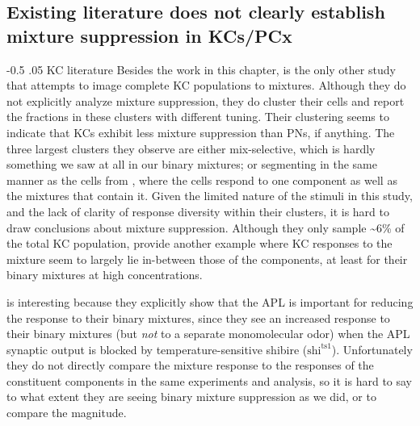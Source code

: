 \documentclass[12pt]{caltech_thesis}
\makeatletter
\let\Oldsubsection\subsection
\renewcommand{\subsection}{\FloatBarrier\Oldsubsection}
\let\Oldsubsubsection\subsubsection
\renewcommand{\subsubsection}{\FloatBarrier\Oldsubsubsection}
\renewcommand\subsubsection{%
    \@startsection{subsubsection}{4}{0mm}%
       {-0.5\baselineskip}%
       {.05\baselineskip}%
       {\normalfont\normalsize\bfseries\itshape}}
\newcommand{\ShibireTsShort}{\ensuremath{\text{shi}^{\text{ts1}}}}
\makeatother
\begin{document}
\begin{refsection}
\subsection{Existing literature does not clearly establish mixture suppression in KCs/PCx}
\subsubsection{KC literature}
Besides the work in this chapter, \textcite{Endo2020} is the only other study that attempts to image complete KC populations to mixtures.
Although they do not explicitly analyze mixture suppression, they do cluster their cells and report the fractions in these clusters with different tuning.
Their clustering seems to indicate that KCs exhibit less mixture suppression than PNs, if anything.
The three largest clusters they observe are either mix-selective, which is hardly something we saw at all in our binary mixtures; or segmenting in the same manner as the cells from \textcite{LocustKCMixSpiking}, where the cells respond to one component as well as the mixtures that contain it.
Given the limited nature of the stimuli in this study, and the lack of clarity of response diversity within their clusters, it is hard to draw conclusions about mixture suppression.
Although they only sample \textasciitilde6\% of the total KC population, \textcite{Campbell2013} provide another example where KC responses to the mixture seem to largely lie in-between those of the components, at least for their binary mixtures at high concentrations.

\textcite{Lin2014} is interesting because they explicitly show that the APL is important for reducing the response to their binary mixtures, since they see an increased response to their binary mixtures (but \textit{not} to a separate monomolecular odor) when the APL synaptic output is blocked by temperature-sensitive shibire (\ShibireTsShort).
Unfortunately they do not directly compare the mixture response to the responses of the constituent components in the same experiments and analysis, so it is hard to say to what extent they are seeing binary mixture suppression as we did, or to compare the magnitude.


\end{refsection}
\end{document}
